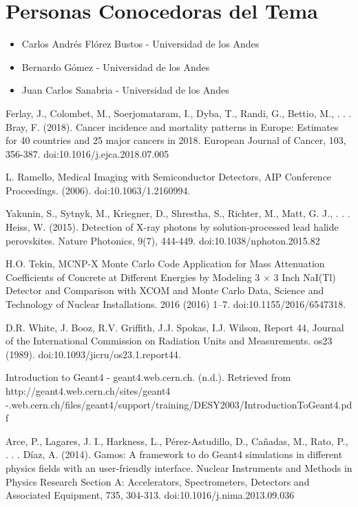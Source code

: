 \documentclass[12pt]{article}
\begin{document}
\section{Personas Conocedoras del Tema}



\begin{itemize}
	\item Carlos Andrés Flórez Bustos - Universidad de los Andes 
	\item Bernardo Gómez - Universidad de los Andes
	\item Juan Carlos Sanabria - Universidad de los Andes
\end{itemize}


\begin{thebibliography}{10}
Ferlay, J., Colombet, M., Soerjomataram, I., Dyba, T., Randi, G., Bettio, M., . . . Bray, F. (2018). Cancer incidence and mortality patterns in Europe: Estimates for 40 countries and 25 major cancers in 2018. European Journal of Cancer, 103, 356-387. doi:10.1016/j.ejca.2018.07.005

L. Ramello, Medical Imaging with Semiconductor Detectors, AIP Conference Proceedings. (2006). doi:10.1063/1.2160994.

Yakunin, S., Sytnyk, M., Kriegner, D., Shrestha, S., Richter, M., Matt, G. J., . . . Heiss, W. (2015). Detection of X-ray photons by solution-processed lead halide perovskites. Nature Photonics, 9(7), 444-449. doi:10.1038/nphoton.2015.82


H.O. Tekin, MCNP-X Monte Carlo Code Application for Mass Attenuation Coefficients of Concrete at Different Energies by Modeling 3 × 3 Inch NaI(Tl) Detector and Comparison with XCOM and Monte Carlo Data, Science and Technology of Nuclear Installations. 2016 (2016) 1–7. doi:10.1155/2016/6547318.

D.R. White, J. Booz, R.V. Griffith, J.J. Spokas, I.J. Wilson, Report 44, Journal of the International Commission on Radiation Units and Measurements. os23 (1989). doi:10.1093/jicru/os23.1.report44.

Introduction to Geant4 - geant4.web.cern.ch. (n.d.). Retrieved from http://geant4.web.cern.ch/sites/geant4
-.web.cern.ch/files/geant4/support/training/DESY2003/IntroductionToGeant4.pdf

Arce, P., Lagares, J. I., Harkness, L., Pérez-Astudillo, D., Cañadas, M., Rato, P., . . . Díaz, A. (2014). Gamos: A framework to do Geant4 simulations in different physics fields with an user-friendly interface. Nuclear Instruments and Methods in Physics Research Section A: Accelerators, Spectrometers, Detectors and Associated Equipment, 735, 304-313. doi:10.1016/j.nima.2013.09.036


\end{thebibliography}
\end{document}

